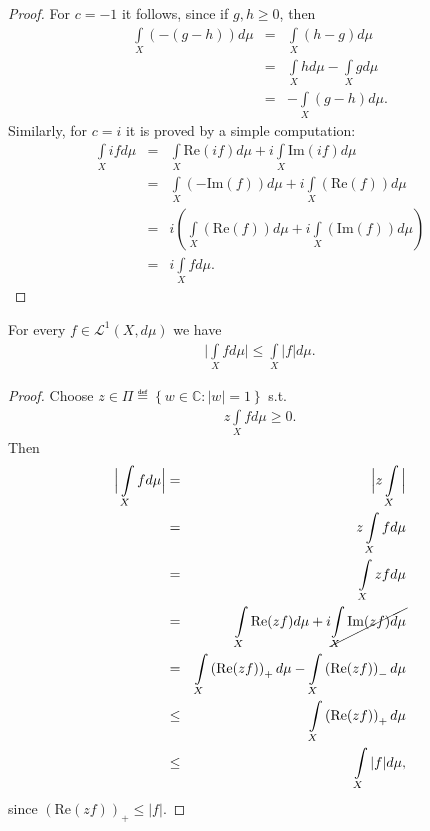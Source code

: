 \begin{proof}
    For \(c=-1\) it follows, since if \(g,h\geq0\), then
    \begin{eqnarray*}
        \int\limits_{X}\left( -(g-h) \right)d\mu &=& \int\limits_{X}\left( h-g \right)d\mu \\
        &=& \int\limits_{X} h d\mu - \int\limits_{X} gd\mu \\
        &=& - \int\limits_{X}\left( g- h \right)d\mu.
    \end{eqnarray*}
    Similarly, for \(c=i\) it is proved by a simple computation:
    \begin{eqnarray*}
        \int\limits_{X} i fd\mu &=& \int\limits_{X} \text{Re}(if)d\mu + i\int\limits_{X}\text{Im}(if)d\mu \\
        &=& \int\limits_{X}\left( -\text{Im}(f) \right)d\mu + i \int\limits_{X} \left( \text{Re}(f) \right)d\mu \\
        &=& i\left( \int\limits_{X}\left( \text{Re}(f) \right) d\mu + i\int\limits_{X} \left( \text{Im}(f) \right)d\mu\right) \\
        &=& i\int\limits_{X} fd\mu.
    \end{eqnarray*}
\end{proof}
\begin{prop}
    For every \(f\in \mathcal{L}^{1}(X,d\mu)\) we have
    \begin{align*}
        \Big|\int\limits_{X}fd\mu\Big| \leq \int\limits_{X}|f|d\mu.
    \end{align*}
\end{prop}
\begin{proof}
    Choose \(z\in \Pi\eqdef \left\{ w\in\mathbb{C} : |w|=1 \right\}\) s.t.
    \begin{align*}
        z\int\limits_{X}fd\mu \geq 0.
    \end{align*}
    Then
    \begin{eqnarray*}
        \Big|\int\limits_{X} fd\mu \Big| &=& \Big|z\int\limits_{X}\Big| \\
        &=& z \int\limits_{X}fd\mu \\
        &=& \int\limits_{X}zfd\mu \\
        &=& \int\limits_{X}\text{Re}(zf)d\mu + i \cancel{\int\limits_{X}\text{Im}(zf)d\mu} \\
        &=& \int\limits_{X}\left(\text{Re}(zf)\right)_{+}d\mu - \int\limits_{X}\left(\text{Re}(zf)\right)_{-}d\mu \\
        &\leq& \int\limits_{X}\left(\text{Re}(zf)\right)_{+}d\mu \\
        &\leq& \int\limits_{X}|f|d\mu,
    \end{eqnarray*}
    since \(\left( \text{Re}(zf) \right)_{+} \leq |f|\).
\end{proof}

